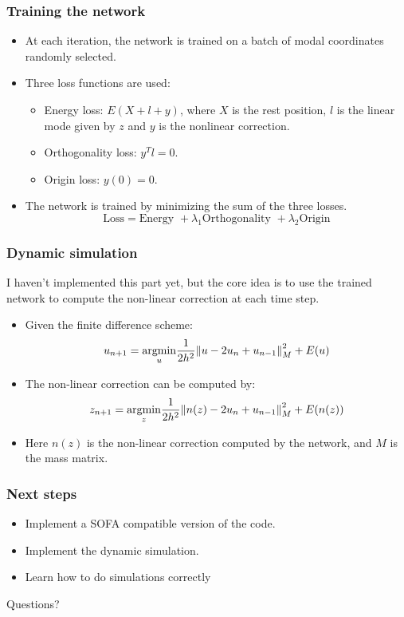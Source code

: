 \documentclass{beamer}
\DeclareMathOperator{\argmin}{argmin}
\begin{document}
\begin{frame}
    \frametitle{Training the network}
    \begin{itemize}
        \item At each iteration, the network is trained on a batch of modal coordinates randomly selected.
        \item Three loss functions are used:
        \begin{itemize}
            \item Energy loss: \( E(X + l + y)\), where \(X\) is the rest position, \(l\) is the linear mode given by \(z\) and \(y\) is the nonlinear correction.
            \item Orthogonality loss: \( y^T l = 0 \).
            \item Origin loss: \( y(0) = 0 \).
        \end{itemize}
        \item The network is trained by minimizing the sum of the three losses.
        \[
        \text{Loss} = \text{Energy } + \lambda_1 \text{Orthogonality } + \lambda_2 \text{Origin}
        \]
    \end{itemize}
\end{frame}

\begin{frame}
    \frametitle{Dynamic simulation}
    I haven't implemented this part yet, but the core idea is to use the trained network to compute the non-linear correction at each time step.
    \begin{itemize}
        \item Given the finite difference scheme:
        \[
          u_{n+1} = \underset{u}{\argmin}  \frac{1}{2h^2} \norm{u - 2u_n + u_{n-1}}^2_M + E(u)
        \]
        \item The non-linear correction can be computed by:
        \[
        z_{n+1} = \underset{z}{\argmin}  \frac{1}{2h^2} \norm{n(z) - 2u_n + u_{n-1}}^2_M + E(n(z))
        \]
        \item Here \(n(z)\) is the non-linear correction computed by the network, and \(M\) is the mass matrix.
    \end{itemize}
\end{frame}

\begin{frame}
    \frametitle{Next steps}
    \begin{itemize}
        \item Implement a SOFA compatible version of the code.
        \item Implement the dynamic simulation.
        \item Learn how to do simulations correctly
    
    \end{itemize}
\end{frame}

\begin{frame}
    \begin{center}
        \Huge{Questions?}
    \end{center}

\end{frame}
\end{document}
